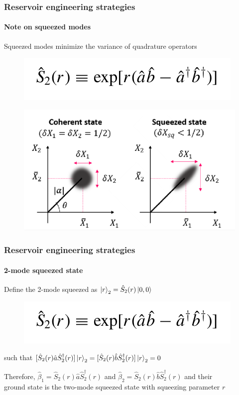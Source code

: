 \documentclass[aspectratio=43]{beamer}
\begin{document}
\begin{frame}

	\frametitle{Reservoir engineering strategies}
	\framesubtitle{Note on squeezed modes}
	
	Squeezed modes minimize the variance of quadrature operators
	\begin{figure}
		\includegraphics[width = 5 cm]{plots/2_squeezed_mode.png}
	\end{figure}	
	
	\begin{figure}
		\includegraphics[width = 7 cm]{plots/plot_squeezed.png}
	\end{figure}

\end{frame}

\begin{frame}
	
	\frametitle{Reservoir engineering strategies}
	\framesubtitle{2-mode squeezed state}
	
	Define the 2-mode squeezed as $\ket{r}_{2} = \hat{S}_{2}(r) \ket{0,0}$
	\begin{figure}
		\includegraphics[width = 5 cm]{plots/2_squeezed_mode.png}
	\end{figure}	

	such that $[\hat{S}_{2}(r) \hat{a} \hat{S}_{2}^{\dagger}(r)]\ket{r}_{2} = [\hat{S}_{2}(r) \hat{b} \hat{S}_{2}^{\dagger}(r)]\ket{r}_{2} = 0$\\
	
	\vspace{0.5cm}
	
	Therefore, $\hat{\beta}_{1} = \hat{S}_{2}(r) \hat{a} \hat{S}_{2}^{\dagger}(r)$ and $\hat{\beta}_{2} = \hat{S}_{2}(r) \hat{b} \hat{S}_{2}^{\dagger}(r)$ and their\\ground state is the two-mode squeezed state with squeezing parameter $r$

\end{frame}
\end{document}
